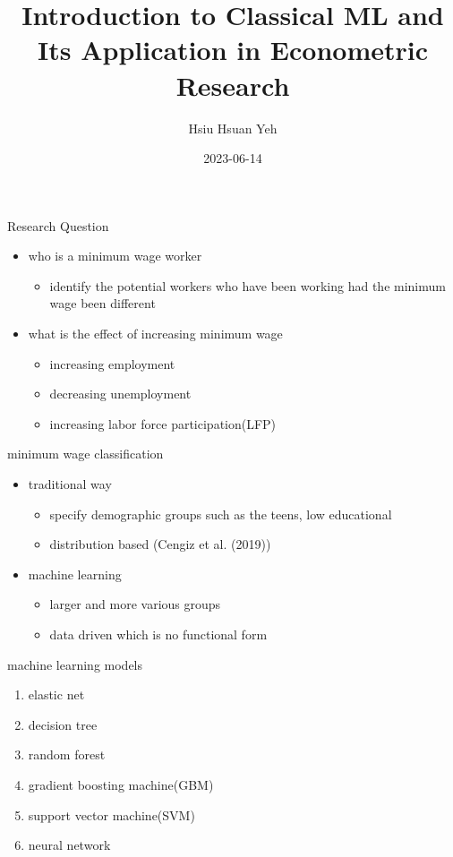 \documentclass[
  ignorenonframetext,
]{beamer}
\title{Introduction to Classical ML and Its Application in Econometric Research}
\subtitle{}
\author{Hsiu Hsuan Yeh}
\date{2023-06-14}
\institute{Dept of Econ \and National Taiwan University}
\begin{document}
\frame{\titlepage}


\begin{frame}{Research Question}
\begin{itemize}
  \item who is a minimum wage worker
  \begin{itemize}
    \item identify the potential workers who have been working had 
          the minimum wage been different
  \end{itemize}

  \item what is the effect of increasing minimum wage
  \begin{itemize}
    \item increasing employment
    \item decreasing unemployment
    \item increasing labor force participation(LFP)
  \end{itemize}
\end{itemize}
\end{frame}


\begin{frame}{minimum wage classification}
\begin{itemize}
  \item traditional way
  \begin{itemize}
    \item specify demographic groups such as the teens, low educational
    \item distribution based (Cengiz et al. (2019))
  \end{itemize}

  \item machine learning
  \begin{itemize}
    \item larger and more various groups
    \item data driven which is no functional form
  \end{itemize}
\end{itemize}
\end{frame}

\begin{frame}{machine learning models}
\begin{enumerate}
  \item elastic net 
  \item decision tree
  \item random forest
  \item gradient boosting machine(GBM)
  \item support vector machine(SVM)
  \item neural network
\end{enumerate}
\end{frame}
  
\end{document}
